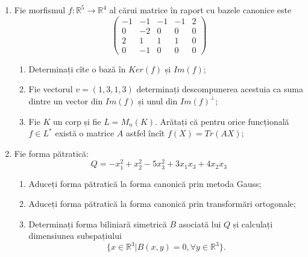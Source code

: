 \documentclass{article}
\begin{document}
\begin{enumerate}
 \item Fie morfismul $f:\mathbb{R}^5 \to \mathbb{R}^4$ al cărui matrice în raport cu bazele canonice este
$$\begin{pmatrix}
-1&-1&-1&-1&2\\
0&-2&0&0&0\\
2&1&1&1&0\\
0&-1&0&0&0
\end{pmatrix}$$

\begin{enumerate}
\item Determinați cîte o bază în $Ker(f)$ și $Im(f)$;
\item Fie vectorul $v=(1,3,1,3)$ determinați descompunerea acestuia ca suma dintre un vector din $Im(f)$ și unul din $Im(f)^\perp$;
\item Fie $K$ un corp și fie $L=M_n(K)$. Arătați că pentru orice funcțională $f \in L^*$ există o matrice $A$ astfel încît $f(X)=Tr(AX)$;
\end{enumerate}
\item Fie forma pătratică:
$$Q= -x_1^2+x_2^2-5x_3^2+3x_1x_3+4x_2x_3$$

\begin{enumerate}
\item Aduceți forma pătratică la forma canonică prin metoda Gauss;
\item Aduceți forma pătratică la forma canonică prin transformări ortogonale;
\item Determinați forma biliniară simetrică $B$ asociată lui $Q$ și calculați dimensiunea subspațiului
$$\{x \in \mathbb{R}^3 | B(x,y)=0,\forall y \in \mathbb{R}^3\}.$$

\end{enumerate}
\end{enumerate}
\newpage
\end{document}
